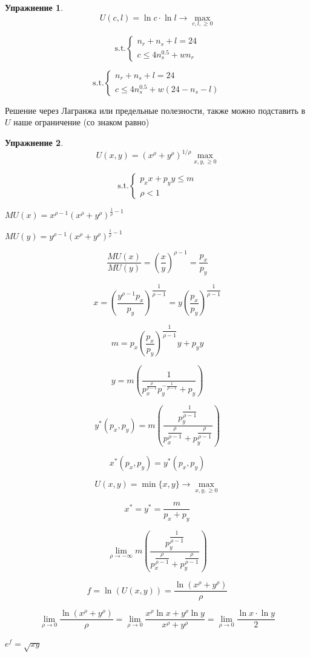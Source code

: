 \documentclass[reqno]{article}
\theoremstyle{definition}
\theoremstyle{definition}
\theoremstyle{definition}
\theoremstyle{definition}
\theoremstyle{definition}
\newtheorem{exc}{Упражнение}[section]
\theoremstyle{definition}
\theoremstyle{definition}
\theoremstyle{definition}
\theoremstyle{definition}
\begin{document}
	\begin{exc}
		$$U(c,l)=\ln c \cdot \ln l \rightarrow \max\limits_{c,l,\geq 0}$$
		
		$$
		\text{s.t.}
		\begin{cases}
			n_r + n_s + l = 24 \\
			
			c \leq 4 n_s^{0.5} + w n_r
		\end{cases}
		$$
		
		$$
		\text{s.t.}
		\begin{cases}
			n_r + n_s + l = 24\\
			
			c \leq 4 n_s^{0.5} + w (24 -n_s-l)
		\end{cases}
		$$
		
		Решение через Лагранжа или предельные полезности, также можно подставить в $U$ наше ограничение (со знаком равно)
		
	\end{exc}
	
	\begin{exc}
		$$U(x,y)=(x^\rho + y^\rho)^{1/\rho} \max\limits_{x,y,\geq 0}$$
		
		$$
		\text{s.t.}
		\begin{cases}
			p_x x + p_y y \leq m \\
			
			\rho < 1
		\end{cases}
		$$
		
		$MU(x) = x^{\rho-1} (x^\rho + y^\rho)^{\frac{1}{\rho}-1}$
		
		$MU(y) = y^{\rho-1} (x^\rho + y^\rho)^{\frac{1}{\rho}-1}$
		
		$$\dfrac{MU(x)}{MU(y)} = \left( \dfrac{x}{y}\right)^{\rho-1} = \dfrac{p_x}{p_y}$$
		
		$$x = \left( \dfrac{y^{\rho-1} p_x}{p_y}\right)^{\dfrac{1}{\rho-1}} = y \left( \dfrac{p_x}{p_y}\right)^{\dfrac{1}{\rho-1}}$$
		
		$$m = p_x \left( \dfrac{p_x}{p_y}\right)^{\dfrac{1}{\rho-1}} y + p_y y$$
		
		$$y=m \left(\dfrac{1}{p_x^{\frac{\rho}{\rho-1}} p_y^{- \frac{1}{\rho-1}} + p_y}\right)$$
				
		$$y^*(p_x,p_y) = m \left( \dfrac{p_y^{\dfrac{1}{\rho-1}}}{p_x^{\dfrac{\rho}{\rho-1}}+p_y^{\dfrac{\rho}{\rho-1}}}\right)$$
		
		$$x^*(p_x,p_y) = y^*(p_x,p_y)$$	%
		
		$$U(x,y) = \min\{x,y\} \rightarrow \max\limits_{x,y,\geq 0}$$
		
		$$x^*=y^*=\dfrac{m}{p_x+p_y}$$
		
		$$\lim_{\rho \rightarrow - \infty} m \left( \dfrac{p_y^{\dfrac{1}{\rho-1}}}{p_x^{\dfrac{\rho}{\rho-1}}+p_y^{\dfrac{\rho}{\rho-1}}}\right)$$
		
		$$f=\ln(U(x,y)) = \dfrac{\ln(x^\rho + y^\rho)}{\rho}$$
		
		$$\lim_{\rho \rightarrow 0} \dfrac{\ln(x^\rho + y^\rho)}{\rho} =\lim_{\rho \rightarrow 0} \dfrac{x^\rho \ln x +y^\rho \ln y}{x^\rho + y^\rho} = \lim_{\rho \rightarrow 0} \dfrac{\ln x \cdot \ln y}{2}$$
		
		$e^f=\sqrt{xy}$
		
	\end{exc}
\end{document}
